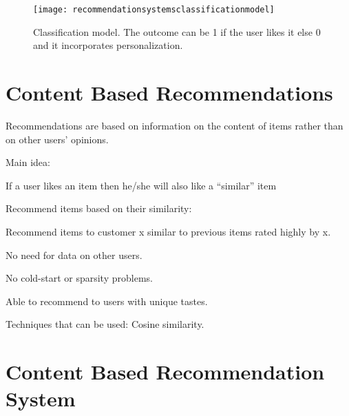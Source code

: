 	\begin{figure}[tbh]
		\centering
		\texttt{[image: recommendationsystemsclassificationmodel]}
		\caption[Classification model]{Classification model.  The outcome can be 1 if the user likes it else 0 and it incorporates personalization.}
		\label{fig:recommendationsystemsclassificationmodel}
	\end{figure}

	\section{Content Based Recommendations}

	\begin{bulletedlist}
		\item Recommendations are based on information on the content of items rather than on other users' opinions.
		\item Main idea:
		\item If a user likes an item then he/she will also like a “similar” item
		\item Recommend items based on their similarity:
		\begin{bulletedlist}
			\item Recommend items to customer x similar to previous items rated highly by x.
		\end{bulletedlist}
		\item No need for data on other users.
		\begin{bulletedlist}
			\item No cold-start or sparsity problems.
		\end{bulletedlist}
		\item Able to recommend to users with unique tastes.
		\item Techniques that can be used: Cosine similarity.
	\end{bulletedlist}

	\section{Content Based Recommendation System}

